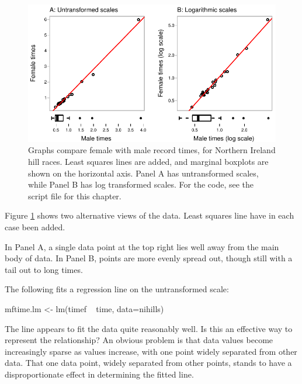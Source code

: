 \documentclass{tufte-book}\usepackage[]{graphicx}\usepackage[]{color}
\begin{document}
\begin{figure}
\begin{Schunk}


\centerline{\includegraphics[width=\textwidth]{figs/8-fVSmTimeAB-1} }

\end{Schunk}
  \caption{Graphs compare female with male record times,
  for Northern Ireland hill races.  Least squares lines
    are added, and marginal boxplots are shown on the
    horizontal axis. Panel A
    has untransformed scales, while Panel B has log
    transformed scales. For the code, see the script
    file for this chapter.}\label{fig:nimff}
\end{figure}

Figure \ref{fig:nimff} shows two alternative views of the data.
Least squares line have in each case been added.  

In Panel A, a single data point at the top right lies well
away from the main body of data.  In Panel B, points are more
evenly spread out, though still with a tail out to long times.

The following fits a regression line on the untransformed
scale:
\begin{Schunk}
\begin{Sinput}
mftime.lm <- lm(timef ~ time, data=nihills)
\end{Sinput}
\end{Schunk}

The line appears to fit the data quite reasonably well. Is this an
effective way to represent the relationship?  An obvious problem is
that data values become increasingly sparse as
values increase, with one point widely separated from other data.
That one data point, widely separated from other points, stands
to have a disproportionate effect in determining the fitted line.
\end{document}
